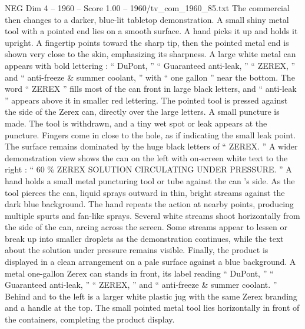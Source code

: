 \begin{textsample}{NEG Dim 4 – 1960 – Score 1.00 – 1960/tv\_com\_1960\_85.txt}
The commercial then changes to a darker, blue-lit tabletop demonstration.
A small shiny metal tool with a pointed end lies on a smooth surface.
A hand picks it up and holds it upright.
A fingertip points toward the sharp tip, then the pointed metal end is shown very close to the skin, emphasizing its sharpness.
A large white metal can appears with bold lettering : “ DuPont, ” “ Guaranteed anti-leak, ” “ ZEREX, ” and “ anti-freeze \& summer coolant, ” with “ one gallon ” near the bottom.
The word “ ZEREX ” fills most of the can front in large black letters, and “ anti-leak ” appears above it in smaller red lettering.
The pointed tool is pressed against the side of the Zerex can, directly over the large letters.
A small puncture is made.
The tool is withdrawn, and a tiny wet spot or leak appears at the puncture.
Fingers come in close to the hole, as if indicating the small leak point.
The surface remains dominated by the huge black letters of “ ZEREX. ” A wider demonstration view shows the can on the left with on-screen white text to the right : “ 60 \% ZEREX SOLUTION CIRCULATING UNDER PRESSURE. ” A hand holds a small metal puncturing tool or tube against the can ’s side.
As the tool pierces the can, liquid sprays outward in thin, bright streams against the dark blue background.
The hand repeats the action at nearby points, producing multiple spurts and fan-like sprays.
Several white streams shoot horizontally from the side of the can, arcing across the screen.
Some streams appear to lessen or break up into smaller droplets as the demonstration continues, while the text about the solution under pressure remains visible.
Finally, the product is displayed in a clean arrangement on a pale surface against a blue background.
A metal one-gallon Zerex can stands in front, its label reading “ DuPont, ” “ Guaranteed anti-leak, ” “ ZEREX, ” and “ anti-freeze \& summer coolant. ” Behind and to the left is a larger white plastic jug with the same Zerex branding and a handle at the top.
The small pointed metal tool lies horizontally in front of the containers, completing the product display.

\end{textsample}
